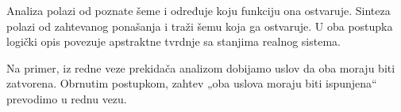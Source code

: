 
Analiza polazi od poznate šeme i određuje koju funkciju ona ostvaruje. Sinteza polazi od zahtevanog ponašanja i traži šemu koja ga ostvaruje. U oba postupka logički opis povezuje apstraktne tvrdnje sa stanjima realnog sistema.

Na primer, iz redne veze prekidača analizom dobijamo uslov da oba moraju biti zatvorena. Obrnutim postupkom, zahtev „oba uslova moraju biti ispunjena“ prevodimo u rednu vezu.
